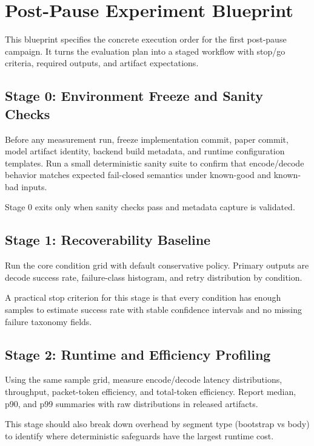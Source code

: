 \section{Post-Pause Experiment Blueprint}

This blueprint specifies the concrete execution order for the first post-pause campaign. It turns the evaluation plan into a staged workflow with stop/go criteria, required outputs, and artifact expectations.

\subsection{Stage 0: Environment Freeze and Sanity Checks}

Before any measurement run, freeze implementation commit, paper commit, model artifact identity, backend build metadata, and runtime configuration templates. Run a small deterministic sanity suite to confirm that encode/decode behavior matches expected fail-closed semantics under known-good and known-bad inputs.

Stage 0 exits only when sanity checks pass and metadata capture is validated.

\subsection{Stage 1: Recoverability Baseline}

Run the core condition grid with default conservative policy. Primary outputs are decode success rate, failure-class histogram, and retry distribution by condition.

A practical stop criterion for this stage is that every condition has enough samples to estimate success rate with stable confidence intervals and no missing failure taxonomy fields.

\subsection{Stage 2: Runtime and Efficiency Profiling}

Using the same sample grid, measure encode/decode latency distributions, throughput, packet-token efficiency, and total-token efficiency. Report median, p90, and p99 summaries with raw distributions in released artifacts.

This stage should also break down overhead by segment type (bootstrap vs body) to identify where deterministic safeguards have the largest runtime cost.

